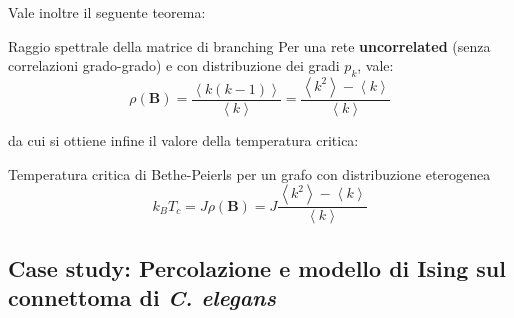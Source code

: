Vale inoltre il seguente teorema:
\begin{boxl}{Raggio spettrale della matrice di branching}
Per una rete \textbf{uncorrelated} (senza correlazioni grado-grado) e con distribuzione dei gradi $p_k$, vale:
\begin{equation}
    \rho(\mathbf{B})=\frac{\left\langle k(k-1)\right\rangle }{\left\langle k\right\rangle }=\frac{\left\langle k^2\right\rangle - \left\langle k\right\rangle }{\left\langle k\right\rangle }
\end{equation}
\end{boxl}
da cui si ottiene infine il valore della temperatura critica:
\begin{boxl}{Temperatura critica di Bethe-Peierls per un grafo con distribuzione eterogenea}
    \begin{equation}
        k_B T_c= J \rho(\mathbf{B})= J \frac{\left\langle k^2\right\rangle - \left\langle k\right\rangle }{\left\langle k\right\rangle }
    \end{equation}
\end{boxl}

\subsection{Case study: Percolazione e modello di Ising sul connettoma di \textit{C. elegans}}

